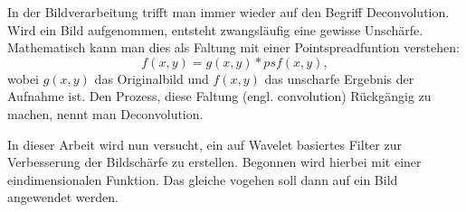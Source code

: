 In der Bildverarbeitung trifft man immer wieder auf den Begriff Deconvolution.
Wird ein Bild aufgenommen, entsteht zwangsläufig eine gewisse Unschärfe.
Mathematisch kann man dies als Faltung mit einer Pointspreadfuntion verstehen:
$$f(x,y) = g(x,y)*psf(x,y),$$
wobei $g(x,y)$ das Originalbild und $f(x,y)$ das unscharfe Ergebnis der Aufnahme ist.
Den Prozess, diese Faltung (engl. convolution) Rückgängig zu machen, nennt man Deconvolution.

In dieser Arbeit wird nun versucht, ein auf Wavelet basiertes Filter zur Verbesserung der Bildschärfe zu erstellen. Begonnen wird hierbei mit einer eindimensionalen Funktion. Das gleiche vogehen soll dann auf ein Bild angewendet werden.

